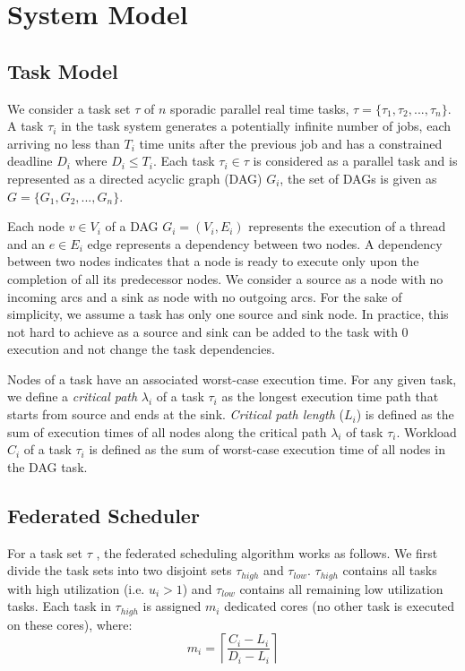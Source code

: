 \section{System Model}

\subsection{Task Model}
We consider a task set $\tau$ of ${n}$ sporadic parallel real time tasks,
$\tau = \{\tau_1,\tau_2, ..., \tau_n\}$. A task $\tau_i$ in the task
system generates a potentially infinite number of jobs, each arriving
no less than $T_i$ time units after the previous job and has a constrained
deadline $D_i$ where $D_i \leq T_i$.  Each task $\tau_i \in \tau$ is
considered as a parallel task and is represented as a directed acyclic
graph (DAG) ${G_i}$, the set of DAGs is given as ${G = \{G_1, G_2,
  ..., G_n\}}$. %


Each node ${v \in V_i}$ of a DAG ${G_i = (V_i, E_i)}$ represents the
execution of a thread and an ${e \in E_i}$ edge represents a
dependency between two nodes. A dependency between two nodes indicates
that a node is ready to execute only upon the completion of all its
predecessor nodes. We consider a source as a node with no incoming
arcs and a sink as node with no outgoing arcs. For the sake of
simplicity, we assume a task has only one source and sink node. In
practice, this not hard to achieve as a source and sink can be added
to the task with $0$ execution and not change the task dependencies.

Nodes of a task have an associated worst-case execution time. For any
given task, we define a \textit{critical path} $\lambda_i$ of a 
task $\tau_i$ as the longest execution time path that starts from
source and ends at the sink. \textit{Critical path length} ($L_i$) is
defined as the sum of execution times of all nodes along the critical
path $\lambda_i$ of task $\tau_i$.  Workload $C_i$ of
a task $\tau_i$ is defined as the sum of worst-case execution time of
all nodes in the DAG task. 


\subsection{Federated Scheduler}
For a task set $\tau$ , the federated scheduling algorithm works as
follows. We first divide the task sets into two disjoint sets
$\tau_{high}$  and $\tau_{low}$. $\tau_{high}$ contains all tasks with
high utilization (i.e. $u_i > 1$) and $\tau_{low}$ contains all
remaining low utilization tasks. Each task in $\tau_{high}$ is
assigned $m_i$ dedicated cores (no other task is executed on these
cores), where: \begin{equation}\label{eq:m} m_i = \left\lceil \frac{C_i - L_i}{D_i - L_i}
\right\rceil \end{equation}

